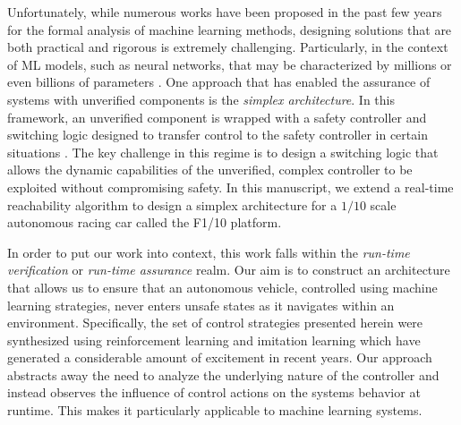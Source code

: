 \documentclass[manuscript,screen,review]{acmart}
\newcommand{\todo}[1]{\textcolor{red}{\textbf{\underline{TODO:}} #1}}
\begin{document}

Unfortunately, while numerous works have been proposed in the past few years for the formal analysis of machine learning methods, designing solutions that are both practical and rigorous is extremely challenging. Particularly, in the context of ML models, such as neural networks, that may be characterized by millions or even billions of parameters \cite{BallesterGoogLeNet,SimonyanVeryDeep}. One approach that has enabled the assurance of systems with unverified components is the \textit{simplex architecture}. In this framework, an unverified component is wrapped with a safety controller and switching logic designed to transfer control to the safety controller in certain situations \cite{RiveraAnArchitectural1996,Bak2014}. The key challenge in this regime is to design a switching logic that allows the dynamic capabilities of the unverified, complex controller to be exploited without compromising safety. In this manuscript, we extend a real-time reachability algorithm \cite{Bak2014,Johnson2016} to design a simplex architecture for a $1/10$ scale autonomous racing car called the F1/10 platform. 

In order to put our work into context, this work falls within the \textit{run-time verification} or \textit{run-time assurance} realm. Our aim is to construct an architecture that allows us to ensure that an autonomous vehicle, controlled using machine learning strategies, never enters unsafe states as it navigates within an environment. Specifically, the set of control strategies presented herein were synthesized using reinforcement learning and imitation learning which have generated a considerable amount of excitement in recent years. Our approach abstracts away the need to analyze the underlying nature of the controller and instead observes the influence of control actions on the systems behavior at runtime. This makes it particularly applicable to machine learning systems. 
\end{document}
